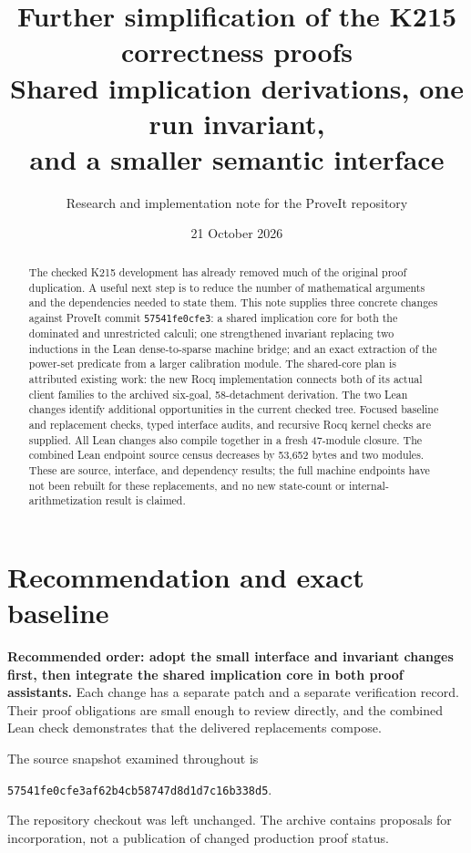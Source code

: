 \documentclass[11pt]{article}
\title{Further simplification of the K215 correctness proofs\\[5pt]
\large Shared implication derivations, one run invariant,\\and a smaller semantic interface}
\author{Research and implementation note for the ProveIt repository}
\date{21 October 2026}
\begin{document}
\maketitle

\begin{abstract}
The checked K215 development has already removed much of the original proof duplication. A useful next step is to reduce the number of mathematical arguments and the dependencies needed to state them. This note supplies three concrete changes against ProveIt commit \texttt{57541fe0cfe3}: a shared implication core for both the dominated and unrestricted calculi; one strengthened invariant replacing two inductions in the Lean dense-to-sparse machine bridge; and an exact extraction of the power-set predicate from a larger calibration module. The shared-core plan is attributed existing work: the new Rocq implementation connects both of its actual client families to the archived six-goal, 58-detachment derivation. The two Lean changes identify additional opportunities in the current checked tree. Focused baseline and replacement checks, typed interface audits, and recursive Rocq kernel checks are supplied. All Lean changes also compile together in a fresh 47-module closure. The combined Lean endpoint source census decreases by 53,652 bytes and two modules. These are source, interface, and dependency results; the full machine endpoints have not been rebuilt for these replacements, and no new state-count or internal-arithmetization result is claimed.
\end{abstract}

\tableofcontents
\newpage

\section{Recommendation and exact baseline}

\textbf{Recommended order: adopt the small interface and invariant changes first, then integrate the shared implication core in both proof assistants.} Each change has a separate patch and a separate verification record. Their proof obligations are small enough to review directly, and the combined Lean check demonstrates that the delivered replacements compose.

The source snapshot examined throughout is
\begin{center}
\texttt{57541fe0cfe3af62b4cb58747d8d1d7c16b338d5}.
\end{center}
The repository checkout was left unchanged. The archive contains proposals for incorporation, not a publication of changed production proof status.
\end{document}
